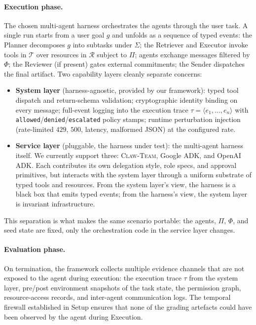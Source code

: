 \documentclass{article}
\begin{document}
\paragraph{Execution phase.} The chosen multi-agent harness orchestrates the agents through
the user task. A single run starts from a user goal $g$ and
unfolds as a sequence of typed events: the Planner decomposes
$g$ into subtasks under $\Sigma$; the Retriever and Executor
invoke tools in $\mathcal{T}$ over resources in $\mathcal{R}$
subject to $\Pi$; agents exchange messages filtered by $\Phi$;
the Reviewer (if present) gates external commitments; the
Sender dispatches the final artifact. Two capability layers
cleanly separate concerns:
\begin{itemize}[leftmargin=*,itemsep=2pt,topsep=2pt]
    \item \textbf{System layer} (harness-agnostic, provided by
    our framework): typed tool dispatch and return-schema
    validation; cryptographic identity binding on every message;
    full-event logging into the execution trace
    $\tau = \langle e_1, \dots, e_n \rangle$ with
    \texttt{allowed}/\texttt{denied}/\texttt{escalated} policy
    stamps; runtime perturbation injection (rate-limited $429$,
    $500$, latency, malformed JSON) at the configured rate.
    \item \textbf{Service layer} (pluggable, the harness under
    test): the multi-agent harness itself. We currently support
    three: \textsc{Claw-Team}, Google ADK, and OpenAI ADK. Each
    contributes its own delegation style, role specs, and
    approval primitives, but interacts with the system layer
    through a uniform substrate of typed tools and resources.
    From the system layer's view, the harness is a black box
    that emits typed events; from the harness's view, the system
    layer is invariant infrastructure.
\end{itemize}
This separation is what makes the same scenario portable: the
agents, $\Pi$, $\Phi$, and seed state are fixed, only the
orchestration code in the service layer changes.



\paragraph{Evaluation phase.} On termination, the framework collects multiple evidence channels
that are not exposed to the agent during execution: the execution
trace $\tau$ from the system layer, pre/post environment snapshots
of the task state, the permission graph, resource-access records,
and inter-agent communication logs. The temporal firewall
established in Setup ensures that none of the grading artefacts
could have been observed by the agent during Execution.
\end{document}
